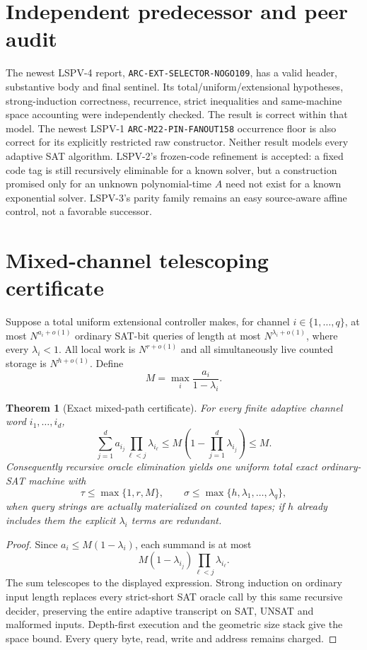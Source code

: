 \documentclass[11pt]{article}
\newtheorem{theorem}{Theorem}
\begin{document}
\section{Independent predecessor and peer audit}
The newest LSPV-4 report, \texttt{ARC-EXT-SELECTOR-NOGO109}, has a valid header,
substantive body and final sentinel.  Its total/uniform/extensional hypotheses,
strong-induction correctness, recurrence, strict inequalities and same-machine
space accounting were independently checked.  The result is correct within
that model.  The newest LSPV-1 \texttt{ARC-M22-PIN-FANOUT158} occurrence floor
is also correct for its explicitly restricted raw constructor.  Neither result
models every adaptive SAT algorithm.  LSPV-2's frozen-code refinement is
accepted: a fixed code tag is still recursively eliminable for a known solver,
but a construction promised only for an unknown polynomial-time $A$ need not
exist for a known exponential solver.  LSPV-3's parity family remains an easy
source-aware affine control, not a favorable successor.

\section{Mixed-channel telescoping certificate}
Suppose a total uniform extensional controller makes, for channel
$i\in\{1,\dots,q\}$, at most $N^{a_i+o(1)}$ ordinary SAT-bit queries of length
at most $N^{\lambda_i+o(1)}$, where every $\lambda_i<1$.  All local work is
$N^{r+o(1)}$ and all simultaneously live counted storage is
$N^{h+o(1)}$.  Define
\[
 M=\max_i\frac{a_i}{1-\lambda_i}.
\]

\begin{theorem}[Exact mixed-path certificate]
For every finite adaptive channel word $i_1,\ldots,i_d$,
\[
 \sum_{j=1}^{d}a_{i_j}\prod_{\ell<j}\lambda_{i_\ell}
 \le M\left(1-\prod_{j=1}^{d}\lambda_{i_j}\right)\le M.
\]
Consequently recursive oracle elimination yields one uniform total exact
ordinary-SAT machine with
\[
 \tau\le\max\{1,r,M\},\qquad
 \sigma\le\max\{h,\lambda_1,\ldots,\lambda_q\},
\]
when query strings are actually materialized on counted tapes; if $h$ already
includes them the explicit $\lambda_i$ terms are redundant.
\end{theorem}
\begin{proof}
Since $a_i\le M(1-\lambda_i)$, each summand is at most
\[
 M(1-\lambda_{i_j})\prod_{\ell<j}\lambda_{i_\ell}.
\]
The sum telescopes to the displayed expression.  Strong induction on ordinary
input length replaces every strict-short SAT oracle call by this same recursive
decider, preserving the entire adaptive transcript on SAT, UNSAT and malformed
inputs.  Depth-first execution and the geometric size stack give the space
bound.  Every query byte, read, write and address remains charged.
\end{proof}
\end{document}
